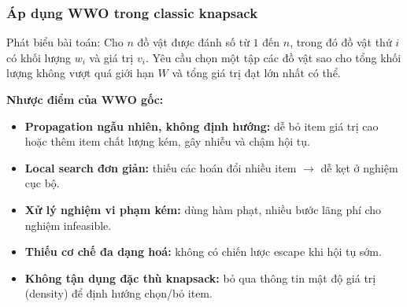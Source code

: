 \begin{frame}
    \frametitle{Áp dụng WWO trong classic knapsack}
    \begin{block}{Phát biểu bài toán:}
        Cho $n$ đồ vật được đánh số từ $1$ đến $n$, trong đó đồ vật thứ $i$ có khối lượng $w_i$ và giá trị $v_i$. 
        Yêu cầu chọn một tập các đồ vật sao cho tổng khối lượng không vượt quá giới hạn $W$ và tổng giá trị đạt lớn nhất có thể. 
    \end{block}

    \textbf{Nhược điểm của WWO gốc:}
        \begin{itemize}
            \item \textbf{Propagation ngẫu nhiên, không định hướng:} dễ bỏ item giá trị cao hoặc thêm item chất lượng kém, gây nhiễu và chậm hội tụ.
            \item \textbf{Local search đơn giản:} thiếu các hoán đổi nhiều item $\rightarrow$ dễ kẹt ở nghiệm cục bộ.
            \item \textbf{Xử lý nghiệm vi phạm kém:} dùng hàm phạt, nhiều bước lãng phí cho nghiệm infeasible.
            \item \textbf{Thiếu cơ chế đa dạng hoá:} không có chiến lược escape khi hội tụ sớm.
            \item \textbf{Không tận dụng đặc thù knapsack:} bỏ qua thông tin mật độ giá trị (density) để định hướng chọn/bỏ item.
        \end{itemize}
\end{frame}

